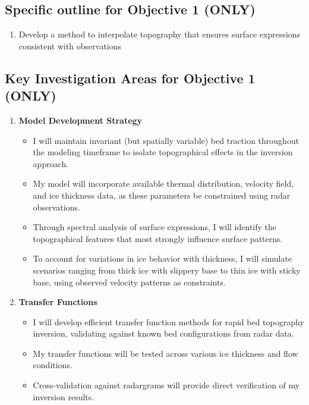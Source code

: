 \subsection*{Specific outline for Objective 1 (ONLY)}
\begin{enumerate}
\item Develop a method to interpolate topography that ensures surface expressions consistent with observations
\end{enumerate}

\subsection*{Key Investigation Areas for Objective 1 (ONLY)}
\begin{enumerate}
\item\textbf{Model Development Strategy}
    \begin{itemize}
    \item I will maintain invariant (but spatially variable) bed traction throughout the modeling timeframe to isolate topographical effects in the inversion approach.
    
    \item My model will incorporate available thermal distribution, velocity field, and ice thickness data, as these parameters be constrained using radar observations.
    
    \item Through spectral analysis of surface expressions, I will identify the topographical features that most strongly influence surface patterns.
    
    \item To account for variations in ice behavior with thickness, I will simulate scenarios ranging from thick ice with slippery base to thin ice with sticky base, using observed velocity patterns as constraints.
    \end{itemize}

\item\textbf{Transfer Functions}
    \begin{itemize}
    \item I will develop efficient transfer function methods for rapid bed topography inversion, validating against known bed configurations from radar data.
    
    \item My transfer functions will be tested across various ice thickness and flow conditions.
    
    \item Cross-validation against radargrams will provide direct verification of my inversion results.
    

\end{itemize}
\end{enumerate}
